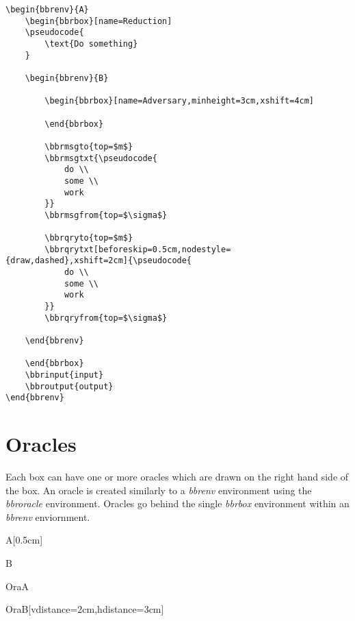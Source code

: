 \documentclass[a4paper]{report}
\begin{document}
\begin{lstlisting}
\begin{bbrenv}{A}
	\begin{bbrbox}[name=Reduction]
	\pseudocode{
		\text{Do something}
	}

	\begin{bbrenv}{B}

		\begin{bbrbox}[name=Adversary,minheight=3cm,xshift=4cm]

		\end{bbrbox}

		\bbrmsgto{top=$m$}
		\bbrmsgtxt{\pseudocode{
			do \\
			some \\
			work
		}}
		\bbrmsgfrom{top=$\sigma$}

		\bbrqryto{top=$m$}
		\bbrqrytxt[beforeskip=0.5cm,nodestyle={draw,dashed},xshift=2cm]{\pseudocode{
			do \\
			some \\
			work
		}}
		\bbrqryfrom{top=$\sigma$}

	\end{bbrenv}

	\end{bbrbox}
	\bbrinput{input}
	\bbroutput{output}
\end{bbrenv}
\end{lstlisting}

\section{Oracles}
Each box can have one or more oracles which are drawn on the right hand side of the box. An oracle
is created similarly to a \emph{bbrenv} environment using the \emph{bbroracle} environment. Oracles
go behind the single \emph{bbrbox} environment within an \emph{bbrenv} enviornment.

\begin{bbrenv}[1cm]{A}[0.5cm]
	\begin{bbrbox}[name=Reduction]

	\begin{bbrenv}{B}
		\begin{bbrbox}[name=Adversary,minheight=3cm,xshift=4cm]
		\end{bbrbox}

	\end{bbrenv}

	\end{bbrbox}

	\begin{bbroracle}{OraA}
		\begin{bbrbox}[name=Oracle 1]
		\end{bbrbox}
	\end{bbroracle}

	\begin{bbroracle}{OraB}[vdistance=2cm,hdistance=3cm]
		\begin{bbrbox}[name=Oracle 2]
		\end{bbrbox}
	\end{bbroracle}
\end{bbrenv}
\end{document}
